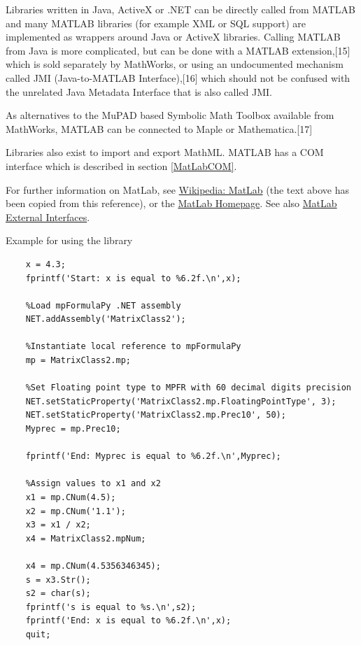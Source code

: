 	\vpara
	Libraries written in Java, ActiveX or .NET can be directly called from MATLAB and many MATLAB libraries (for example XML or SQL support) are implemented as wrappers around Java or ActiveX libraries. Calling MATLAB from Java is more complicated, but can be done with a MATLAB extension,[15] which is sold separately by MathWorks, or using an undocumented mechanism called JMI (Java-to-MATLAB Interface),[16] which should not be confused with the unrelated Java Metadata Interface that is also called JMI.
	
	\vpara
	As alternatives to the MuPAD based Symbolic Math Toolbox available from MathWorks, MATLAB can be connected to Maple or Mathematica.[17]
	
	\vpara
	Libraries also exist to import and export MathML. MATLAB has a COM interface which is described in section \ref{MatLabCOM}.
	
	
	\vpara
	For further information on MatLab, see \href{http://en.wikipedia.org/wiki/MATLAB}{Wikipedia: MatLab} (the text above has been copied from this reference), or the  \href{http://www.mathworks.com/}{MatLab Homepage}. See also \href{http://www.mathworks.co.uk/help/matlab/external-interfaces.html}{MatLab External Interfaces}.	
	
	
	
	\newpage
	Example for using the library
	
	\begin{lstlisting}
	x = 4.3;
	fprintf('Start: x is equal to %6.2f.\n',x);
	
	%Load mpFormulaPy .NET assembly 
	NET.addAssembly('MatrixClass2');
	
	%Instantiate local reference to mpFormulaPy
	mp = MatrixClass2.mp;
	
	%Set Floating point type to MPFR with 60 decimal digits precision
	NET.setStaticProperty('MatrixClass2.mp.FloatingPointType', 3);
	NET.setStaticProperty('MatrixClass2.mp.Prec10', 50);
	Myprec = mp.Prec10;
	
	fprintf('End: Myprec is equal to %6.2f.\n',Myprec);
	
	%Assign values to x1 and x2
	x1 = mp.CNum(4.5);
	x2 = mp.CNum('1.1');
	x3 = x1 / x2;
	x4 = MatrixClass2.mpNum;
	
	x4 = mp.CNum(4.5356346345);
	s = x3.Str();
	s2 = char(s);
	fprintf('s is equal to %s.\n',s2);
	fprintf('End: x is equal to %6.2f.\n',x);
	quit;
	\end{lstlisting}
	
	





